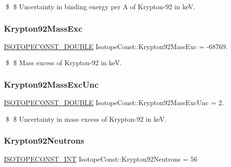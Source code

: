 \$ \$ Uncertainty in binding energy per A of Krypton-\/92 in keV. \mbox{\label{group___isotope_const-_krypton-_kr92_gaae7adbf54a305d4a907a78a61fd42588}} 
\subsubsection{\texorpdfstring{Krypton92\+Mass\+Exc}{Krypton92MassExc}}
{\footnotesize\ttfamily \mbox{\hyperlink{group___isotope_const-_macros_ga8f45a7272ce02c0b4c65c44636ed719a}{I\+S\+O\+T\+O\+P\+E\+C\+O\+N\+S\+T\+\_\+\+D\+O\+U\+B\+LE}} Isotope\+Const\+::\+Krypton92\+Mass\+Exc = -\/68769.}

\$ \$ Mass excess of Krypton-\/92 in keV. \mbox{\label{group___isotope_const-_krypton-_kr92_gafae0eee4898a228aa15b45a118b1ce51}} 
\subsubsection{\texorpdfstring{Krypton92\+Mass\+Exc\+Unc}{Krypton92MassExcUnc}}
{\footnotesize\ttfamily \mbox{\hyperlink{group___isotope_const-_macros_ga8f45a7272ce02c0b4c65c44636ed719a}{I\+S\+O\+T\+O\+P\+E\+C\+O\+N\+S\+T\+\_\+\+D\+O\+U\+B\+LE}} Isotope\+Const\+::\+Krypton92\+Mass\+Exc\+Unc = 2.}

\$ \$ Uncertainty in mass excess of Krypton-\/92 in keV. \mbox{\label{group___isotope_const-_krypton-_kr92_gab74dfee12c23f26949ea2473b48623d1}} 
\subsubsection{\texorpdfstring{Krypton92\+Neutrons}{Krypton92Neutrons}}
{\footnotesize\ttfamily \mbox{\hyperlink{group___isotope_const-_macros_ga5f18360b3e99483a35c32d789e62621c}{I\+S\+O\+T\+O\+P\+E\+C\+O\+N\+S\+T\+\_\+\+I\+NT}} Isotope\+Const\+::\+Krypton92\+Neutrons = 56}

